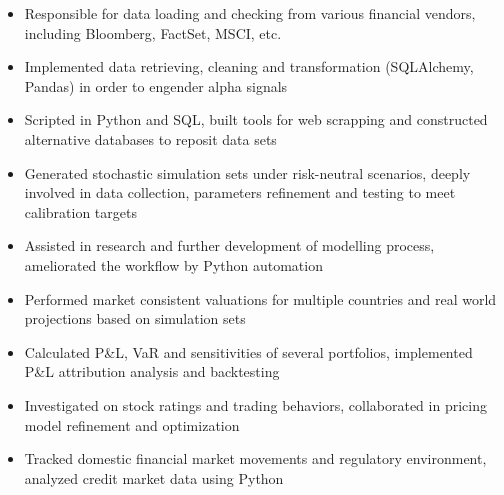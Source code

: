 \documentclass[10pt]{article}
\begin{document}
    \begin{itemize}
        \item Responsible for data loading and checking from various financial vendors, including Bloomberg, FactSet, MSCI, etc.
        \item Implemented data retrieving, cleaning and transformation (SQLAlchemy, Pandas) in order to engender alpha signals
        \item Scripted in Python and SQL, built tools for web scrapping and constructed alternative databases to reposit data sets
    \end{itemize}
    \begin{itemize}
        \item Generated stochastic simulation sets under risk-neutral scenarios, deeply involved in data collection, parameters refinement and testing to meet calibration targets
        \item Assisted in research and further development of modelling process, ameliorated the workflow by Python automation
        \item Performed market consistent valuations for multiple countries and real world projections based on simulation sets
    \end{itemize}
    \begin{itemize}
        \item Calculated P\&L, VaR and sensitivities of several portfolios, implemented P\&L attribution analysis and backtesting
        \item Investigated on stock ratings and trading behaviors, collaborated in pricing model refinement and optimization
        \item Tracked domestic financial market movements and regulatory environment, analyzed credit market data using Python
    \end{itemize}
\end{document}
